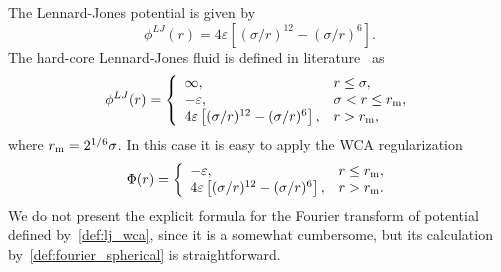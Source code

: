The Lennard-Jones potential is given by
\begin{equation}
	\phi^{LJ}(r) = 4\varepsilon \left[(\sigma/r)^{12} - (\sigma/r)^6\right].
\end{equation}
The hard-core Lennard-Jones fluid is defined in literature~\cite{SowersStanley1991,DiezLargoSolana2010} as
\begin{equation}
	\phi^{LJ}(r) = \left\{
	\begin{array}{llll}
		\infty, & r\leq \sigma,
		\\
		-\varepsilon, & \sigma < r \leq r_{\rm m}, 
		\\
		4\varepsilon \left[(\sigma/r)^{12} - (\sigma/r)^6\right], & r > r_{\rm m},
	\end{array}
	\right.
\end{equation}
where $r_{\rm m}=2^{1/6}\sigma$.
In this case it is easy to apply the WCA regularization
\begin{equation}
	\label{def:lj_wca}
	\Phi(r) = \left\{
	\begin{array}{ll}
		-\varepsilon, & r \leq r_{\rm m},
		\\
		4\varepsilon \left[(\sigma/r)^{12} - (\sigma/r)^6\right], & r > r_{\rm m}.
	\end{array}	
	\right.
\end{equation}
We do not present the explicit formula for the Fourier transform of potential defined by~\eqref{def:lj_wca}, since it is a somewhat cumbersome, but its calculation by~\eqref{def:fourier_spherical} is straightforward.

